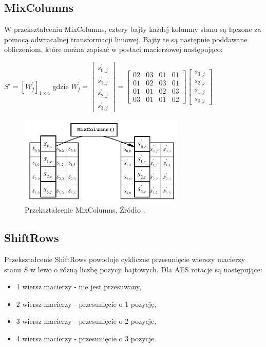 \subsection{MixColumns}
W przekształceniu MixColumns, cztery bajty każdej kolumny stanu są łączone za pomocą odwracalnej transformacji liniowej. Bajty te są następnie poddawane obliczeniom, które można zapisać w postaci macierzowej następująco:
\begin{center}
$S'=[W^{'}_{j}]_{1 \times 4}$ gdzie $W^{'}_{j}=
\begin{bmatrix} 
  s^{'}_{0,j} \\
  s^{'}_{1,j} \\
  s^{'}_{2,j} \\
  s^{'}_{3,j}
\end{bmatrix}
=
\begin{bmatrix} 
  02 & 03 & 01 & 01 \\
  01 & 02 & 03 & 01 \\
  01 & 01 & 02 & 03 \\
  03 & 01 & 01 & 02 
\end{bmatrix}
\begin{bmatrix} 
  s_{3,j} \\
  s_{2,j} \\
  s_{1,j} \\
  s_{0,j}
\end{bmatrix}
$
\end{center}

\begin{figure}[H]
    \centering
    \includegraphics[width=0.7\textwidth]{rysunki/AES_opis/mixcolumns.PNG}
    \caption{Przekształcenie MixColumns. Źródło \cite{fips_197}.}
    \label{fig:mixcolumns}
\end{figure}

\subsection{ShiftRows}
Przekształcenie ShiftRows powoduje cykliczne przesunięcie wierszy macierzy stanu $S$ w lewo o różną liczbę pozycji bajtowych. Dla AES rotacje są następujące:
\begin{itemize}
	\item 1 wiersz macierzy - nie jest przesuwany,
	\item 2 wiersz macierzy - przesunięcie o 1 pozycję,
	\item 3 wiersz macierzy - przesunięcie o 2 pozycje,
	\item 4 wiersz macierzy - przesunięcie o 3 pozycje.
\end{itemize}

